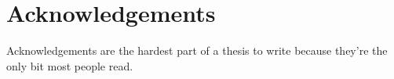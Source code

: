 \chapter*{Acknowledgements}

Acknowledgements are the hardest part of a thesis to write because
they're the only bit most people read.

